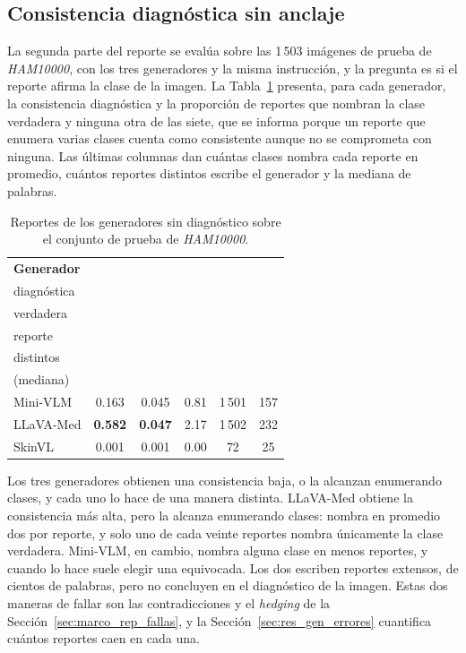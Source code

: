 \subsection{Consistencia diagnóstica sin anclaje}
\label{sec:res_gen_sin_anclaje}

La segunda parte del reporte se evalúa sobre las 1\,503 imágenes de prueba de \emph{HAM10000}, con los tres
generadores y la misma instrucción, y la pregunta es si el reporte afirma la clase de la imagen. La
Tabla~\ref{tab:res_gen_sin_anclaje} presenta, para cada generador, la consistencia diagnóstica y la proporción de
reportes que nombran la clase verdadera y ninguna otra de las siete, que se informa porque un reporte que enumera
varias clases cuenta como consistente aunque no se comprometa con ninguna. Las últimas columnas dan cuántas clases
nombra cada reporte en promedio, cuántos reportes distintos escribe el generador y la mediana de palabras.

\begin{table}[H]
    \centering
    \caption{Reportes de los generadores sin diagnóstico sobre el conjunto de prueba de \emph{HAM10000}.}
    \label{tab:res_gen_sin_anclaje}
    \small
    \setlength{\tabcolsep}{3pt}
    \begin{tabularx}{\textwidth}{@{}>{\raggedright\arraybackslash}X ccccc@{}}
        \toprule
        \textbf{Generador} & \textbf{\encabezado{Consistencia\\diagnóstica}}~$\uparrow$ & \textbf{\encabezado{Solo la clase\\verdadera}}~$\uparrow$
            & \textbf{\encabezado{Clases por\\reporte}} & \textbf{\encabezado{Reportes\\distintos}}
            & \textbf{\encabezado{Palabras\\(mediana)}} \\
        \midrule
        Mini-VLM & 0.163 & 0.045 & 0.81 & 1\,501 & 157 \\
        LLaVA-Med & \textbf{0.582} & \textbf{0.047} & 2.17 & 1\,502 & 232 \\
        SkinVL & 0.001 & 0.001 & 0.00 & 72 & 25 \\
        \bottomrule
    \end{tabularx}
\end{table}

Los tres generadores obtienen una consistencia baja, o la alcanzan enumerando clases, y cada uno lo hace de una manera
distinta. LLaVA-Med obtiene la consistencia más alta, pero la alcanza enumerando clases: nombra en promedio dos por
reporte, y solo uno de cada veinte reportes nombra únicamente la clase verdadera. Mini-VLM, en cambio, nombra alguna
clase en menos reportes, y cuando lo hace suele elegir una equivocada. Los dos escriben reportes extensos, de cientos de
palabras, pero no concluyen en el diagnóstico de la imagen. Estas dos maneras de fallar son las contradicciones y el
\emph{hedging} de la Sección~\ref{sec:marco_rep_fallas}, y la Sección~\ref{sec:res_gen_errores} cuantifica cuántos
reportes caen en cada una.

